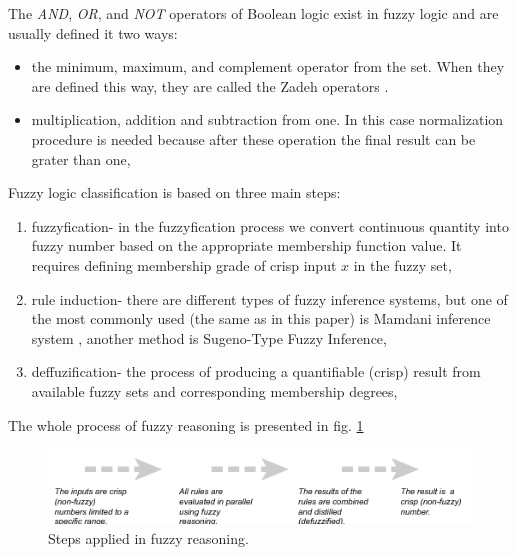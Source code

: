 The \textit{AND}, \textit{OR}, and \textit{NOT} operators of 
Boolean logic exist in fuzzy logic and are usually defined it two ways:
\begin{itemize}
    \item the minimum, maximum, and complement operator from the set. 
        When they are defined this way, they are called the Zadeh operators \cite{bib2}.
    \item multiplication, addition and subtraction from one. In this case
        normalization procedure is needed because after these operation the
        final result can be grater than one,
\end{itemize}
Fuzzy logic classification is based on three main steps:
\begin{enumerate}
    \item fuzzyfication- in the fuzzyfication process we 
        convert continuous quantity into fuzzy number based on the appropriate
        membership function value. It requires defining
        membership grade of crisp input $x$ in the fuzzy set,
    \item rule induction- there are different types of fuzzy inference systems,
        but one of the most commonly used (the same as in this paper) is
        Mamdani inference system \cite{bib46}, another method is Sugeno-Type
        Fuzzy Inference,
    \item deffuzification- the process of producing a quantifiable (crisp) result
        from available fuzzy sets and corresponding membership degrees,
\end{enumerate}
The whole process of fuzzy reasoning is presented in fig.
\ref{fig:fuzzy_reasoning}
\begin{figure}[H]
    \begin{center}
        \includegraphics[width=\textwidth]{fig/fuzzy_steps.png}
    \end{center}
    \caption{Steps applied in fuzzy reasoning.}
    \label{fig:fuzzy_reasoning}
\end{figure}

